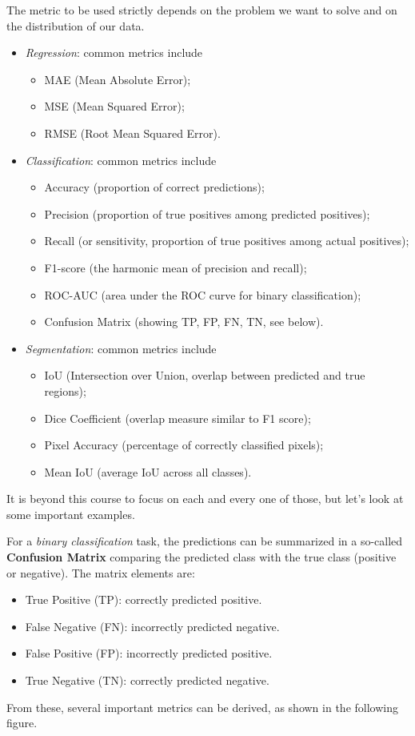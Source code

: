 The metric to be used strictly depends on the problem we want to solve and on the distribution of our data.
\begin{itemize}
    \item\textit{Regression}: common metrics include 
    \begin{itemize}
        \item[-] MAE (Mean Absolute Error);
        \item[-] MSE (Mean Squared Error);
        \item[-] RMSE (Root Mean Squared Error).
    \end{itemize}   
    \item \textit{Classification}: common metrics include 
    \begin{itemize}
        \item[-] Accuracy (proportion of correct predictions);
        \item[-] Precision (proportion of true positives among predicted positives);
        \item[-] Recall (or sensitivity, proportion of true positives among actual positives);
        \item[-] F1-score (the harmonic mean of precision and recall);
        \item[-] ROC-AUC (area under the ROC curve for binary classification);
        \item[-] Confusion Matrix (showing TP, FP, FN, TN, see below).
    \end{itemize}
    \item \textit{Segmentation}: common metrics include
    \begin{itemize}
        \item[-] IoU (Intersection over Union, overlap between predicted and true regions);
        \item[-] Dice Coefficient (overlap measure similar to F1 score);
        \item[-] Pixel Accuracy (percentage of correctly classified pixels);
        \item[-] Mean IoU (average IoU across all classes).
    \end{itemize}
\end{itemize}
It is beyond this course to focus on each and every one of those, but let's look at some important examples.

For a \textit{binary classification} task, the predictions can be summarized in a so-called \textbf{Confusion Matrix} comparing the predicted class with the true class (positive or negative). The matrix elements are:
\begin{itemize}
    \item[-] True Positive (TP): correctly predicted positive.
    \item[-] False Negative (FN): incorrectly predicted negative.
    \item[-] False Positive (FP): incorrectly predicted positive.
    \item[-] True Negative (TN): correctly predicted negative.
\end{itemize}
From these, several important metrics can be derived, as shown in the following figure.

